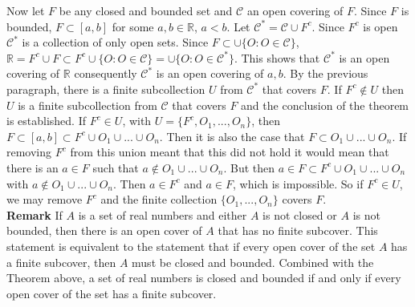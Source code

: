 \documentclass[a4paper]{article}
\begin{document}
Now let $F$ be any closed and bounded set and $\mathcal{C}$ an open covering of $F$. Since $F$ is bounded, $F \subset [a,b]$ for some $a,b \in \mathbb{R}$, $a<b$. Let $\mathcal{C}^* = \mathcal{C}\cup F^c$. Since $F^c$ is open $\mathcal{C}^*$ is a collection of only open sets. Since $F \subset \cup \{O : O \in \mathcal{C}\}$, $\mathbb{R} = F^c \cup F \subset F^c \cup \{O : O \in \mathcal{C}\} = \cup \{O : O \in \mathcal{C}^*\}$. This shows that $\mathcal{C}^*$ is an open covering of $\mathbb{R}$ consequently $\mathcal{C}^*$ is an open covering of ${a,b}$. By the previous paragraph, there is a finite subcollection $U$ from $\mathcal{C}^*$ that covers $F$. If $F^c \not \in U$ then $U$ is a finite subcollection from $\mathcal{C}$ that covers $F$ and the conclusion of the theorem is established. If $F^c \in U$, with $U = \{F^c,O_1,...,O_n\}$, then $F \subset [a,b] \subset F^c \cup O_1 \cup ... \cup O_n$. Then it is also the case that $F \subset O_1 \cup ... \cup O_n$. If removing $F^c$ from this union meant that this did not hold it would mean that there is an $a \in F$ such that $a \not \in O_1 \cup ... \cup O_n$. But then $a \in F \subset F^c \cup O_1 \cup ... \cup O_n$ with $a \not \in O_1 \cup ... \cup O_n$. Then $a \in F^c$ and $a \in F$, which is impossible. So if $F^c \in U$, we may remove $F^c$ and the finite collection $\{O_1,...,O_n\}$ covers $F$.\\

{\bf Remark} If $A$ is a set of real numbers and either $A$ is not closed or $A$ is not bounded, then there is an open cover of $A$ that has no finite subcover. This statement is equivalent to the statement that if every open cover of the set $A$ has a finite subcover, then $A$ must be closed and bounded. Combined with the Theorem above, a set of real numbers is closed and bounded if and only if every open cover of the set has a finite subcover. \\
\end{document}
